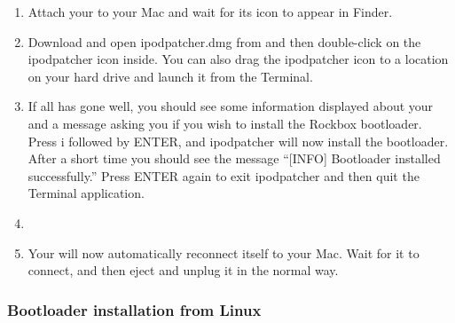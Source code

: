 \begin{enumerate}

\item Attach your \dap{} to your Mac and wait for its icon to appear in 
Finder. 

\item Download and open ipodpatcher.dmg from 
and then double-click on the ipodpatcher icon inside. You can also
drag the ipodpatcher icon to a location on your hard drive and launch
it from the Terminal.

\item If all has gone well, you should see some 
information displayed about your \dap{} and a message asking you if you 
wish to install the Rockbox bootloader. Press i followed by ENTER, and 
ipodpatcher will now install the bootloader. After a short time you 
should see the message ``[INFO] Bootloader installed successfully.'' Press 
ENTER again to exit ipodpatcher and then quit the Terminal application.

\item {}

\item Your \dap{} will now automatically reconnect itself to your Mac. 
Wait for it to connect, and then eject and unplug it in the normal way. 

\end{enumerate}

\subsubsection{Bootloader installation from Linux}

